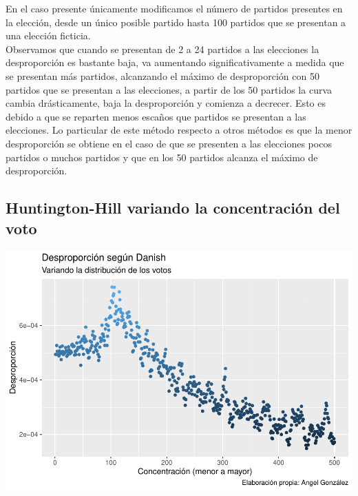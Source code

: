 \documentclass[12pt,a4paper,]{book}
\numberwithin{dummy}{section}
\theoremstyle{ocrenumbox}
\theoremstyle{blacknumex}
\theoremstyle{blacknumbox}
\theoremstyle{ocrenum}
\theoremstyle{ocrenum}
\begin{document}
En el caso presente únicamente modificamos el número de partidos
presentes en la elección, desde un único posible partido hasta 100
partidos que se presentan a una elección ficticia.\\
Observamos que cuando se presentan de 2 a 24 partidos a las elecciones
la desproporción es bastante baja, va aumentando significativamente a
medida que se presentan más partidos, alcanzando el máximo de
desproporción con 50 partidos que se presentan a las elecciones, a
partir de los 50 partidos la curva cambia drásticamente, baja la
desproporción y comienza a decrecer. Esto es debido a que se reparten
menos escaños que partidos se presentan a las elecciones. Lo particular
de este método respecto a otros métodos es que la menor desproporción se
obtiene en el caso de que se presenten a las elecciones pocos partidos o
muchos partidos y que en los 50 partidos alcanza el máximo de
desproporción.

\hypertarget{huntington-hill-variando-la-concentraciuxf3n-del-voto}{%
\subsection{Huntington-Hill variando la concentración del
voto}\label{huntington-hill-variando-la-concentraciuxf3n-del-voto}}

\begin{center}\includegraphics[width=0.95\linewidth]{figurasR/unnamed-chunk-38-1} \end{center}
\end{document}
